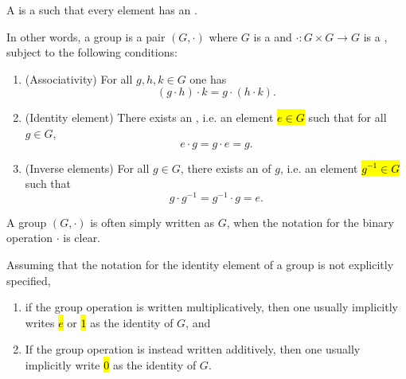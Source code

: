 \begin{definition}[Groups] \label{definition:group}
    A  is a  such that every element has an .

    In other words, a group is a pair $(G,\cdot)$ where $G$ is a  and $\cdot : G \times G \to G$ is a , subject to the following conditions:

    \begin{enumerate}
        \item (Associativity) For all $g,h,k \in G$ one has 
        $$ (g \cdot h) \cdot k = g \cdot (h \cdot k). $$
        \item (Identity element) There exists an , i.e. an element \hl{$e \in G$} such that for all $g \in G$, 
        $$ e \cdot g = g \cdot e = g. $$
        \item (Inverse elements) For all $g \in G$, there exists an  of $g$, i.e. an element \hl{$g^{-1} \in G$} such that 
        $$ g \cdot g^{-1} = g^{-1} \cdot g = e. $$
    \end{enumerate}


    A group $(G, \cdot)$ is often simply written as $G$, when the notation for the binary operation $\cdot$ is clear. 
    
    Assuming that the notation for the identity element of a group is not explicitly specified, 
    \begin{enumerate}
        \item if the group operation is written multiplicatively, then one usually implicitly writes \hl{$e$} or \hl{$1$} as the identity of $G$, and 
        \item If the group operation is instead written additively, then one usually implicitly write \hl{$0$} as the identity of $G$.
    \end{enumerate}


\end{definition}
